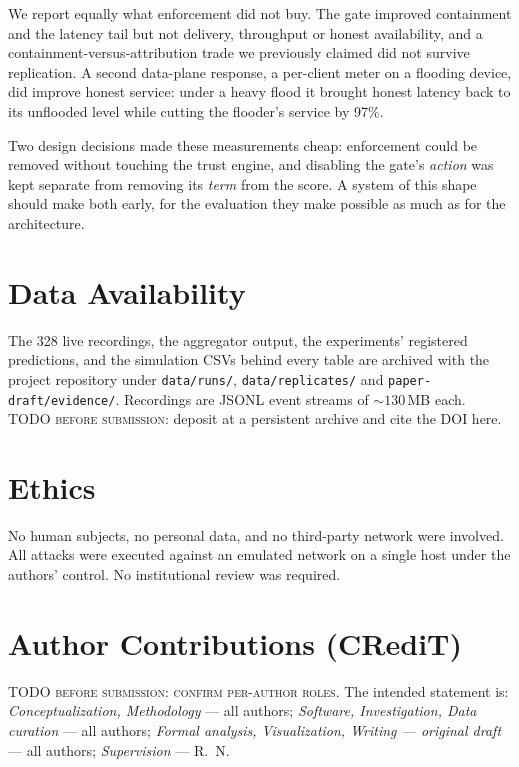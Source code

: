 \documentclass[10pt,twocolumn,letterpaper]{article}
\begin{document}
We report equally what enforcement did not buy. The gate improved containment
and the latency tail but not delivery, throughput or honest availability, and a
containment-versus-attribution trade we previously claimed did not survive
replication. A second data-plane response, a per-client meter on a flooding
device, did improve honest service: under a heavy flood it brought honest
latency back to its unflooded level while cutting the flooder's service by 97\%.

Two design decisions made these measurements cheap: enforcement could be
removed without touching the trust engine, and disabling the gate's
\emph{action} was kept separate from removing its \emph{term} from the score.
A system of this shape should make both early, for the evaluation they make
possible as much as for the architecture.

\section*{Data Availability}
The 328 live recordings, the aggregator output, the experiments'
registered predictions, and the simulation CSVs
behind every table are archived with the project repository under
\texttt{data/runs/}, \texttt{data/replicates/} and
\texttt{paper-draft/evidence/}. Recordings are JSONL event streams of
${\sim}130$\,MB each. \textsc{TODO before submission:} deposit at a persistent
archive and cite the DOI here.

\section*{Ethics}
No human subjects, no personal data, and no third-party network were involved.
All attacks were executed against an emulated network on a single host under
the authors' control. No institutional review was required.

\section*{Author Contributions (CRediT)}
\textsc{TODO before submission: confirm per-author roles.} The intended
statement is: \emph{Conceptualization, Methodology} --- all authors;
\emph{Software, Investigation, Data curation} --- all authors;
\emph{Formal analysis, Visualization, Writing --- original draft} --- all
authors; \emph{Supervision} --- R.~N.
\end{document}
